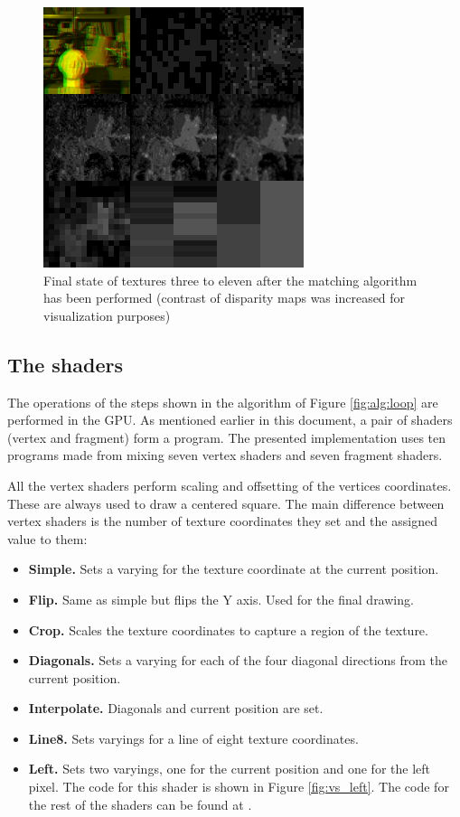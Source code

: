 \documentclass[conference]{IEEEtran}
\begin{document}
\begin{figure}[!t]
	\centering
	\includegraphics[width=3.0in]{texturesfinal}
	\caption{Final state of textures three to eleven after the matching algorithm has been performed (contrast of disparity maps was increased for visualization purposes)}
	\label{fig:texturesfinal}
\end{figure}

	\subsection{The shaders}
The operations of the steps shown in the algorithm of Figure \ref{fig:alg:loop} are performed in the GPU. As mentioned earlier in this document, a pair of shaders (vertex and fragment) form a program. The presented implementation uses ten programs made from mixing seven vertex shaders and seven fragment shaders.

All the vertex shaders perform scaling and offsetting of the vertices coordinates. These are always used to draw a centered square. The main difference between vertex shaders is the number of texture coordinates they set and the assigned value to them:
\begin{itemize}
	\item {\bfseries Simple.} Sets a varying for the texture coordinate at the current position.
	\item {\bfseries Flip.} Same as simple but flips the Y axis. Used for the final drawing.
	\item {\bfseries Crop.} Scales the texture coordinates to capture a region of the texture.
	\item {\bfseries Diagonals.} Sets a varying for each of the four diagonal directions from the current position.
	\item {\bfseries Interpolate.} Diagonals and current position are set.
	\item {\bfseries Line8.} Sets varyings for a line of eight texture coordinates.
	\item {\bfseries Left.} Sets two varyings, one for the current position and one for the left pixel. The code for this shader is shown in Figure \ref{fig:vs_left}. The code for the rest of the shaders can be found at \cite{paguiar14}.
\end{itemize}
\end{document}
